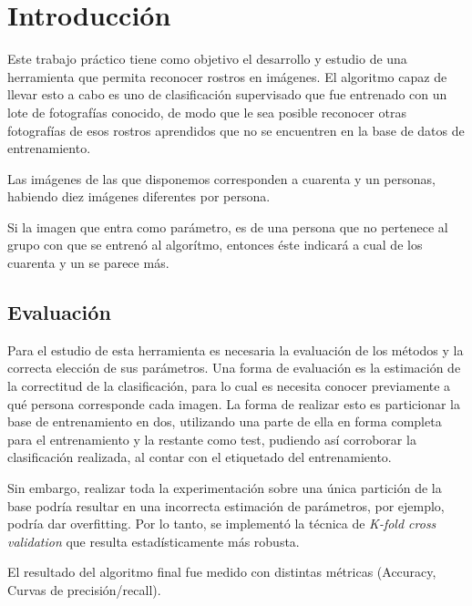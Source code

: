 \section{Introducción}

Este trabajo práctico tiene como objetivo el desarrollo y estudio de una herramienta que permita reconocer rostros en imágenes. El algoritmo capaz de llevar esto a cabo es uno de clasificación supervisado que fue entrenado con un lote de fotografías conocido, de modo que le sea posible reconocer otras fotografías de esos rostros aprendidos que no se encuentren en la base de datos de entrenamiento.

Las imágenes de las que disponemos corresponden a cuarenta y un personas, habiendo diez imágenes diferentes por persona.

Si la imagen que entra como parámetro, es de una persona que no pertenece al grupo con que se entrenó al algorítmo, entonces éste indicará a cual de los cuarenta y un se parece más.

\subsection{Evaluación}

Para el estudio de esta herramienta es necesaria la evaluación de los métodos y la correcta elección de sus parámetros. Una forma de evaluación es la estimación de la correctitud de la clasificación, para lo cual es necesita conocer previamente a qué persona corresponde cada imagen. La forma de realizar esto es particionar la base de entrenamiento en dos, utilizando una parte de ella en forma completa para el entrenamiento y la restante como test, pudiendo así corroborar la clasificación realizada, al contar con el etiquetado del entrenamiento.

Sin embargo, realizar toda la experimentación sobre una única partición de la base podría resultar en una incorrecta estimación de parámetros, por ejemplo, podría dar overfitting. Por lo tanto, se implementó la técnica de \textit{K-fold cross validation} que resulta estadísticamente más robusta.

El resultado del algoritmo final fue medido con distintas métricas (Accuracy, Curvas de precisión/recall).



